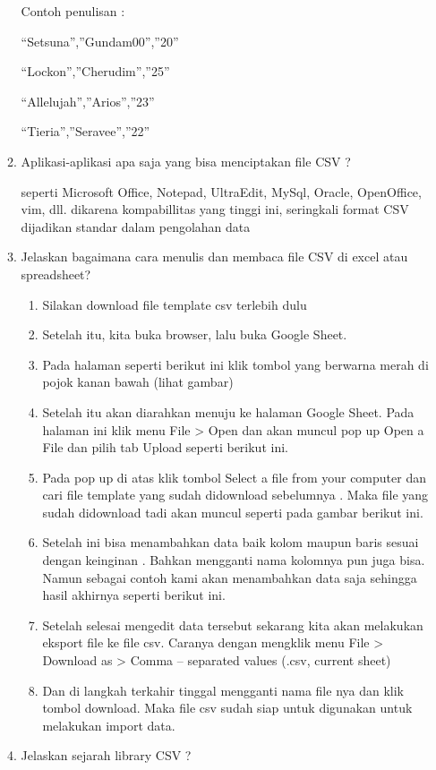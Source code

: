 \begin{enumerate}
\begin{enumerate}
Contoh penulisan :

“Setsuna”,”Gundam00”,”20”

“Lockon”,”Cherudim”,”25”

“Allelujah”,”Arios”,”23”

“Tieria”,”Seravee”,”22”

\item Aplikasi-aplikasi apa saja yang bisa menciptakan file CSV ?

seperti Microsoft Office, Notepad, UltraEdit, MySql, Oracle, OpenOffice, vim, dll. dikarena kompabillitas yang tinggi ini, seringkali format CSV dijadikan standar dalam pengolahan data

\item Jelaskan bagaimana cara menulis dan membaca file CSV di excel atau spreadsheet?
	\begin{enumerate}
	\item Silakan download file template csv terlebih dulu
	\item Setelah itu, kita buka browser, lalu buka Google Sheet.
	\item Pada halaman seperti berikut ini klik tombol yang berwarna merah di pojok kanan bawah (lihat gambar)
	\item Setelah itu  akan diarahkan menuju ke halaman Google Sheet. Pada halaman ini klik menu File > Open dan akan muncul pop up Open a File dan pilih tab Upload seperti berikut ini.
	\item Pada pop up di atas klik tombol Select a file from your computer dan cari file template yang sudah didownload sebelumnya . Maka file yang sudah didownload tadi akan muncul seperti pada gambar berikut ini.
	\item Setelah ini  bisa menambahkan data baik kolom maupun baris sesuai dengan keinginan . Bahkan mengganti nama kolomnya pun juga bisa. Namun sebagai contoh kami akan menambahkan data saja sehingga hasil akhirnya seperti berikut ini.
	\item Setelah selesai mengedit data tersebut sekarang kita akan melakukan eksport file ke file csv. Caranya dengan mengklik menu File > Download as > Comma – separated values (.csv, current sheet)
	\item Dan di langkah terkahir tinggal mengganti nama file nya dan klik tombol download. Maka file csv sudah siap untuk digunakan untuk melakukan import data.

	\end{enumerate}


\item Jelaskan sejarah library CSV ?



\end{enumerate}
\end{enumerate}
